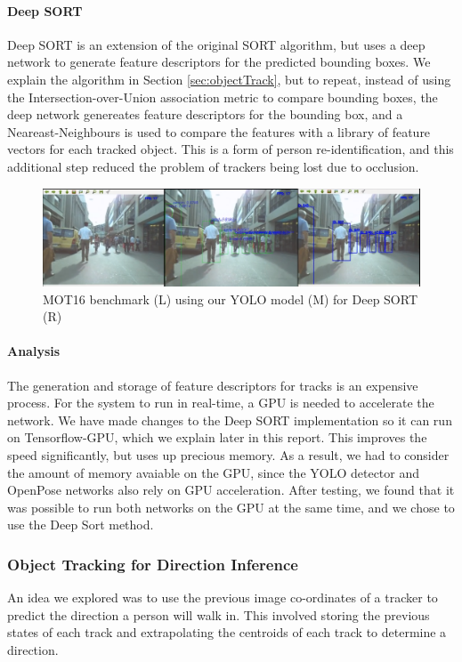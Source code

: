 \paragraph{Deep SORT} Deep SORT is an extension of the original SORT algorithm, but uses a deep network to generate feature descriptors for the predicted bounding boxes. We explain the algorithm in Section \ref{sec:objectTrack}, but to repeat, instead of using the Intersection-over-Union association metric to compare bounding boxes, the deep network genereates feature descriptors for the bounding box, and a Neareast-Neighbours is used to compare the features with a library of feature vectors for each tracked object. This is a form of person re-identification, and this additional step reduced the problem of trackers being lost due to occlusion.

\begin{figure}[ht]
	\centering
	\includegraphics[width=1.0\linewidth]{img/chapter4_analysis/deepSortMOT.png}
	\caption{MOT16 benchmark \cite{Milan} (L) using our YOLO model (M) for Deep SORT (R)}
	\label{fig:deepSortMOT}
	\vspace{-1\baselineskip}
\end{figure}

\paragraph{Analysis} The generation and storage of feature descriptors for tracks is an expensive process. For the system to run in real-time, a GPU is needed to accelerate the network. We have made changes to the Deep SORT implementation so it can run on Tensorflow-GPU, which we explain later in this report. This improves the speed significantly, but uses up precious memory. As a result, we had to consider the amount of memory avaiable on the GPU, since the YOLO detector and OpenPose networks also rely on GPU acceleration. After testing, we found that it was possible to run both networks on the GPU at the same time, and we chose to use the Deep Sort method.

\subsubsection{Object Tracking for Direction Inference} \label{sec:objecTrackingDirection}
An idea we explored was to use the previous image co-ordinates of a tracker to predict the direction a person will walk in. This involved storing the previous states of each track and extrapolating the centroids of each track to determine a direction.

